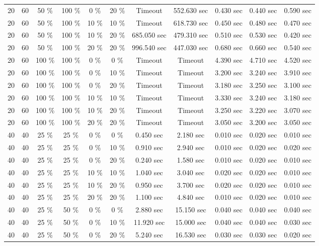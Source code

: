 \documentclass{article}
\begin{document}
\begin{longtable}[]{@{}ccccccccccc@{}}
20 & 60 & 50 \% & 100 \% & 0 \% & 20 \% & Timeout & 552.630 sec & 0.430 sec & 0.440 sec & 0.590 sec \\
20 & 60 & 50 \% & 100 \% & 10 \% & 10 \% & Timeout & 618.730 sec & 0.450 sec & 0.480 sec & 0.470 sec \\
20 & 60 & 50 \% & 100 \% & 10 \% & 20 \% & 685.050 sec & 479.310 sec & 0.510 sec & 0.530 sec & 0.420 sec \\
20 & 60 & 50 \% & 100 \% & 20 \% & 20 \% & 996.540 sec & 447.030 sec & 0.680 sec & 0.660 sec & 0.540 sec \\
20 & 60 & 100 \% & 100 \% & 0 \% & 0 \% & Timeout & Timeout & 4.390 sec & 4.710 sec & 4.520 sec \\
20 & 60 & 100 \% & 100 \% & 0 \% & 10 \% & Timeout & Timeout & 3.200 sec & 3.240 sec & 3.910 sec \\
20 & 60 & 100 \% & 100 \% & 0 \% & 20 \% & Timeout & Timeout & 3.180 sec & 3.250 sec & 3.100 sec \\
20 & 60 & 100 \% & 100 \% & 10 \% & 10 \% & Timeout & Timeout & 3.330 sec & 3.240 sec & 3.180 sec \\
20 & 60 & 100 \% & 100 \% & 10 \% & 20 \% & Timeout & Timeout & 3.250 sec & 3.220 sec & 3.070 sec \\
20 & 60 & 100 \% & 100 \% & 20 \% & 20 \% & Timeout & Timeout & 3.050 sec & 3.200 sec & 3.050 sec \\
40 & 40 & 25 \% & 25 \% & 0 \% & 0 \% & 0.450 sec & 2.180 sec & 0.010 sec & 0.020 sec & 0.010 sec \\
40 & 40 & 25 \% & 25 \% & 0 \% & 10 \% & 0.910 sec & 2.940 sec & 0.010 sec & 0.020 sec & 0.020 sec \\
40 & 40 & 25 \% & 25 \% & 0 \% & 20 \% & 0.240 sec & 1.580 sec & 0.010 sec & 0.020 sec & 0.010 sec \\
40 & 40 & 25 \% & 25 \% & 10 \% & 10 \% & 1.040 sec & 3.040 sec & 0.020 sec & 0.020 sec & 0.010 sec \\
40 & 40 & 25 \% & 25 \% & 10 \% & 20 \% & 0.950 sec & 3.700 sec & 0.020 sec & 0.020 sec & 0.010 sec \\
40 & 40 & 25 \% & 25 \% & 20 \% & 20 \% & 1.100 sec & 4.840 sec & 0.010 sec & 0.020 sec & 0.010 sec \\
40 & 40 & 25 \% & 50 \% & 0 \% & 0 \% & 2.880 sec & 15.150 sec & 0.040 sec & 0.040 sec & 0.040 sec \\
40 & 40 & 25 \% & 50 \% & 0 \% & 10 \% & 11.920 sec & 15.000 sec & 0.040 sec & 0.040 sec & 0.030 sec \\
40 & 40 & 25 \% & 50 \% & 0 \% & 20 \% & 5.240 sec & 16.530 sec & 0.030 sec & 0.030 sec & 0.020 sec \\

\end{longtable}
\end{document}
